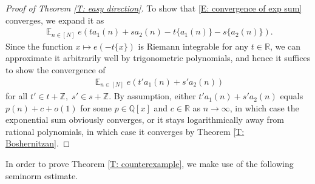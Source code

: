 \documentclass[11pt]{amsart}
\theoremstyle{definition}
\DeclareMathOperator*{\E}{\mathbb{E}}
\newcommand{\Q}{{\mathbb Q}}
\newcommand{\R}{{\mathbb R}}
\newcommand{\Z}{{\mathbb Z}}
\newcommand{\CH}{{\mathcal H}}
\newcommand{\1}{{\mathbf{1}}}
\newcommand{\floor}[1]{{\left \lfloor #1 \right \rfloor}}
\begin{document}
\begin{proof}[Proof of Theorem \ref{T: easy direction}]
    To show that \eqref{E: convergence of exp sum} converges, we expand it as
    \begin{align*}
        \E_{n\in[N]}e(t a_1(n)+s a_2(n) - t\{a_1(n)\}-s\{a_2(n)\}).
    \end{align*}
    Since the function $x\mapsto e(-t\{x\})$ is Riemann integrable for any $t\in\R$, we can approximate it arbitrarily well by trigonometric polynomials, and hence it suffices to show the convergence of 
    \begin{align*}
        \E_{n\in[N]}e(t' a_1(n)+s' a_2(n))
    \end{align*}
    for all $t'\in t+\Z,\; s'\in s+\Z$. By assumption, either $t' a_1(n)+s' a_2(n)$ equals $p(n)+c + o(1)$ for some $p\in\Q[x]$ and $c\in\R$ as $n\to\infty$, in which case the exponential sum obviously converges, or it stays logarithmically away from rational polynomials, in which case it converges by Theorem \ref{T: Boshernitzan}.    
\end{proof}


In order to prove Theorem \ref{T: counterexample}, we make use of the following seminorm estimate.
\end{document}
